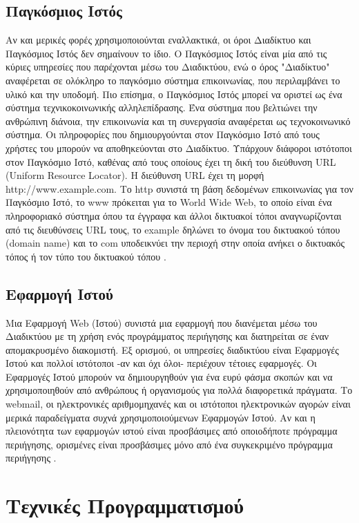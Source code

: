 \subsection{Παγκόσμιος Ιστός}
Αν και μερικές φορές χρησιμοποιούνται εναλλακτικά, οι όροι Διαδίκτυο και Παγκόσμιος Ιστός δεν σημαίνουν το ίδιο. Ο Παγκόσμιος Ιστός είναι μία από τις κύριες υπηρεσίες που παρέχονται μέσω του Διαδικτύου, ενώ ο όρος "Διαδίκτυο" αναφέρεται σε ολόκληρο το παγκόσμιο σύστημα επικοινωνίας, που περιλαμβάνει το υλικό και την υποδομή. Πιο επίσημα, ο Παγκόσμιος Ιστός μπορεί να οριστεί ως ένα σύστημα τεχνικοκοινωνικής αλληλεπίδρασης. Ένα σύστημα που βελτιώνει την ανθρώπινη διάνοια, την επικοινωνία και τη συνεργασία αναφέρεται ως τεχνοκοινωνικό σύστημα. Οι πληροφορίες που δημιουργούνται στον Παγκόσμιο Ιστό από τους χρήστες του μπορούν να αποθηκεύονται στο Διαδίκτυο. Υπάρχουν διάφοροι ιστότοποι στον Παγκόσμιο Ιστό, καθένας από τους οποίους έχει τη δική του διεύθυνση URL (Uniform Resource Locator). Η διεύθυνση URL έχει τη μορφή http://www.example.com. Το http συνιστά τη βάση δεδομένων επικοινωνίας για τον Παγκόσμιο Ιστό, το www πρόκειται για το World Wide Web, το οποίο είναι ένα πληροφοριακό σύστημα όπου τα έγγραφα και άλλοι δικτυακοί τόποι αναγνωρίζονται από τις διευθύνσεις URL τους, το example δηλώνει το όνομα του δικτυακού τόπου (domain name) και το com υποδεικνύει την περιοχή στην οποία ανήκει ο δικτυακός τόπος ή τον τύπο του δικτυακού τόπου \cite{aghaei2012evolution}.

\subsection{Εφαρμογή Ιστού}
Μια Εφαρμογή Web (Ιστού) συνιστά μια εφαρμογή που διανέμεται μέσω του Διαδικτύου με τη χρήση ενός προγράμματος περιήγησης και διατηρείται σε έναν απομακρυσμένο διακομιστή. Εξ ορισμού, οι υπηρεσίες διαδικτύου είναι Εφαρμογές Ιστού και πολλοί ιστότοποι -αν και όχι όλοι- περιέχουν τέτοιες εφαρμογές. Οι Εφαρμογές Ιστού μπορούν να δημιουργηθούν για ένα ευρύ φάσμα σκοπών και να χρησιμοποιηθούν από ανθρώπους ή οργανισμούς για πολλά διαφορετικά πράγματα. Το webmail, οι ηλεκτρονικές αριθμομηχανές και οι ιστότοποι ηλεκτρονικών αγορών είναι μερικά παραδείγματα συχνά χρησιμοποιούμενων Εφαρμογών Ιστού. Αν και η πλειονότητα των εφαρμογών ιστού είναι προσβάσιμες από οποιοδήποτε πρόγραμμα περιήγησης, ορισμένες είναι προσβάσιμες μόνο από ένα συγκεκριμένο πρόγραμμα περιήγησης \cite{Web_Apps}.

\section{Τεχνικές Προγραμματισμού}

